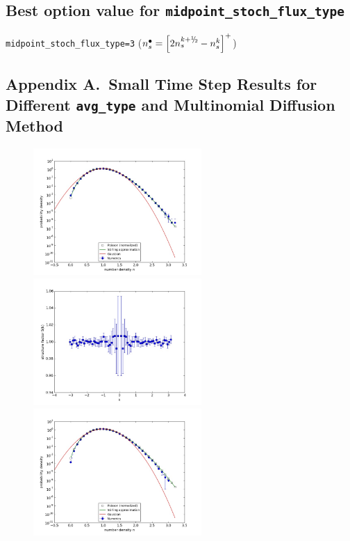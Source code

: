\documentclass{article}
\def\myhalf {\sfrac{1}{2}}
\newcommand{\sfrac}[2]{\mathchoice
  {\kern0em\raise.5ex\hbox{\the\scriptfont0 #1}\kern-.15em/
   \kern-.15em\lower.25ex\hbox{\the\scriptfont0 #2}}
  {\kern0em\raise.5ex\hbox{\the\scriptfont0 #1}\kern-.15em/
   \kern-.15em\lower.25ex\hbox{\the\scriptfont0 #2}}
  {\kern0em\raise.5ex\hbox{\the\scriptscriptfont0 #1}\kern-.2em/
   \kern-.15em\lower.25ex\hbox{\the\scriptscriptfont0 #2}}
  {#1\!/#2}}
\begin{document}
\subsection*{\textbf{Best option value for \texttt{midpoint\_stoch\_flux\_type}}}

\texttt{midpoint\_stoch\_flux\_type=3} ($n_s^\bullet=\left[2n_s^{k+\myhalf}-n_s^k\right]^+$)

\clearpage

\subsection*{Appendix A.~Small Time Step Results for Different \texttt{avg\_type} and Multinomial Diffusion Method}

\begin{figure}
\begin{center}
\end{center}
\includegraphics[width=0.5\linewidth,height=1.9in]{fig1/appendix_dt0.01_diff_hist_avg1.jpg}
\includegraphics[width=0.5\linewidth,height=1.9in]{fig1/appendix_dt0.01_diff_Sk_avg1.jpg}
\includegraphics[width=0.5\linewidth,height=1.9in]{fig1/appendix_dt0.01_diff_hist_avg2.jpg}

\end{figure}
\end{document}
